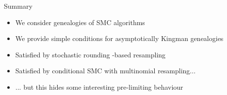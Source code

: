 \documentclass[aspectratio=169]{beamer}
\theoremstyle{definition}
\begin{document}
\begin{frame}{Summary}
\begin{itemize}
\item We consider genealogies of SMC algorithms
\item We provide simple conditions for asymptotically Kingman genealogies
\item Satisfied by stochastic rounding -based resampling
\item Satisfied by conditional SMC with multinomial resampling...
\item ... but this hides some interesting pre-limiting behaviour
\end{itemize}
\end{frame}
\end{document}
